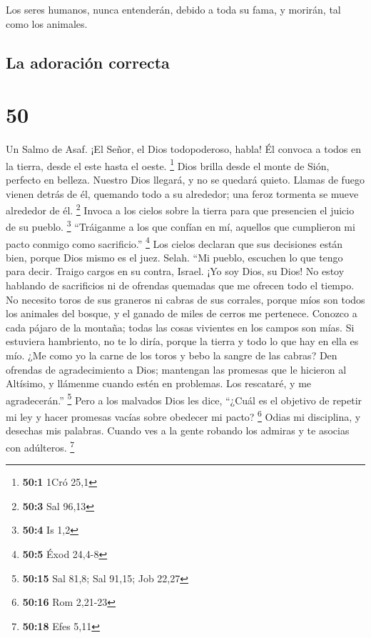  Los seres humanos, nunca entenderán, debido a toda su
fama, y morirán, tal como los animales.

\hypertarget{la-adoraciuxf3n-correcta}{%
\subsection{La adoración correcta}\label{la-adoraciuxf3n-correcta}}

\hypertarget{section-49}{%
\section{50}\label{section-49}}

Un Salmo de Asaf.  ¡El Señor, el Dios todopoderoso, habla!
Él convoca a todos en la tierra, desde el este hasta el oeste.
\footnote{\textbf{50:1} 1Cró 25,1}  Dios brilla desde el
monte de Sión, perfecto en belleza.  Nuestro Dios llegará, y
no se quedará quieto. Llamas de fuego vienen detrás de él, quemando todo
a su alrededor; una feroz tormenta se mueve alrededor de él. \footnote{\textbf{50:3}
  Sal 96,13}  Invoca a los cielos sobre la tierra para que
presencien el juicio de su pueblo. \footnote{\textbf{50:4} Is 1,2}
 ``Tráiganme a los que confían en mí, aquellos que
cumplieron mi pacto conmigo como sacrificio.'' \footnote{\textbf{50:5}
  Éxod 24,4-8}  Los cielos declaran que sus decisiones están
bien, porque Dios mismo es el juez. Selah.  ``Mi pueblo,
escuchen lo que tengo para decir. Traigo cargos en su contra, Israel.
¡Yo soy Dios, su Dios!  No estoy hablando de sacrificios ni
de ofrendas quemadas que me ofrecen todo el tiempo.  No
necesito toros de sus graneros ni cabras de sus corrales, 
porque míos son todos los animales del bosque, y el ganado de miles de
cerros me pertenece.  Conozco a cada pájaro de la montaña;
todas las cosas vivientes en los campos son mías.  Si
estuviera hambriento, no te lo diría, porque la tierra y todo lo que hay
en ella es mío.  ¿Me como yo la carne de los toros y bebo
la sangre de las cabras?  Den ofrendas de agradecimiento a
Dios; mantengan las promesas que le hicieron al Altísimo, 
y llámenme cuando estén en problemas. Los rescataré, y me agradecerán.''
\footnote{\textbf{50:15} Sal 81,8; Sal 91,15; Job 22,27} 
Pero a los malvados Dios les dice, ``¿Cuál es el objetivo de repetir mi
ley y hacer promesas vacías sobre obedecer mi pacto? \footnote{\textbf{50:16}
  Rom 2,21-23}  Odias mi disciplina, y desechas mis
palabras.  Cuando ves a la gente robando los admiras y te
asocias con adúlteros. \footnote{\textbf{50:18} Efes 5,11}

